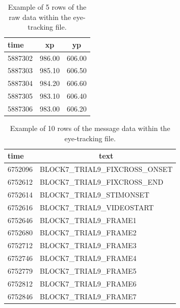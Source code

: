 \documentclass[
  man]{apa6}
\begin{document}
\begin{table}[tbp]

\begin{center}
\begin{threeparttable}

\caption{\label{tab:eyelink-raw}Example of 5 rows of the raw data within the eye-tracking file.}

\begin{tabular}{lll}
\toprule
time & \multicolumn{1}{c}{xp} & \multicolumn{1}{c}{yp}\\
\midrule
5887302 & 986.00 & 606.00\\
5887303 & 985.10 & 606.50\\
5887304 & 984.20 & 606.60\\
5887305 & 983.10 & 606.40\\
5887306 & 983.00 & 606.20\\
\bottomrule
\end{tabular}

\end{threeparttable}
\end{center}

\end{table}

\begin{table}[tbp]

\begin{center}
\begin{threeparttable}

\caption{\label{tab:eyelink-msg}Example of 10 rows of the message data within the eye-tracking file.}

\begin{tabular}{ll}
\toprule
time & \multicolumn{1}{c}{text}\\
\midrule
6752096 & BLOCK7\_TRIAL9\_FIXCROSS\_ONSET\\
6752612 & BLOCK7\_TRIAL9\_FIXCROSS\_END\\
6752614 & BLOCK7\_TRIAL9\_STIMONSET\\
6752616 & BLOCK7\_TRIAL9\_VIDEOSTART\\
6752646 & BLOCK7\_TRIAL9\_FRAME1\\
6752680 & BLOCK7\_TRIAL9\_FRAME2\\
6752712 & BLOCK7\_TRIAL9\_FRAME3\\
6752746 & BLOCK7\_TRIAL9\_FRAME4\\
6752779 & BLOCK7\_TRIAL9\_FRAME5\\
6752812 & BLOCK7\_TRIAL9\_FRAME6\\
6752846 & BLOCK7\_TRIAL9\_FRAME7\\
\bottomrule
\end{tabular}

\end{threeparttable}
\end{center}

\end{table}
\end{document}
